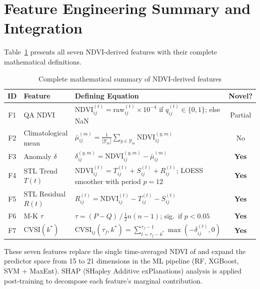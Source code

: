 \documentclass[12pt, a4paper]{article}
\begin{document}
\section{Feature Engineering Summary and Integration}
\label{sec:summary}

Table~\ref{tab:features_math} presents all seven NDVI-derived features
with their complete mathematical definitions.

\begin{table}[H]
\centering
\caption{Complete mathematical summary of NDVI-derived features}
\label{tab:features_math}
\small
\begin{tabularx}{\textwidth}{@{}clXc@{}}
\toprule
\textbf{ID} & \textbf{Feature} & \textbf{Defining Equation} &
\textbf{Novel?} \\
\midrule
F1 & QA NDVI &
  $\mathrm{NDVI}_{ij}^{(t)} = \mathrm{raw}_{ij}^{(t)} \times 10^{-4}$
  if $q_{ij}^{(t)} \in \{0,1\}$; else NaN & Partial \\[4pt]
F2 & Climatological mean &
  $\bar{\mu}_{ij}^{(m)} = \frac{1}{|\mathcal{Y}_m|}
  \sum_{y \in \mathcal{Y}_m} \mathrm{NDVI}_{ij}^{(y,m)}$ & No \\[4pt]
\rowcolor{lightgreen}
F3 & Anomaly $\delta$ &
  $\delta_{ij}^{(y,m)} = \mathrm{NDVI}_{ij}^{(y,m)} -
  \bar{\mu}_{ij}^{(m)}$ & \textbf{Yes} \\[4pt]
\rowcolor{lightgreen}
F4 & STL Trend $T(t)$ &
  $\mathrm{NDVI}_{ij}^{(t)} = T_{ij}^{(t)} + S_{ij}^{(t)} +
  R_{ij}^{(t)}$; LOESS smoother with period $p=12$ & \textbf{Yes} \\[4pt]
\rowcolor{lightgreen}
F5 & STL Residual $R(t)$ &
  $R_{ij}^{(t)} = \mathrm{NDVI}_{ij}^{(t)} - T_{ij}^{(t)} -
  S_{ij}^{(t)}$ & \textbf{Yes} \\[4pt]
\rowcolor{lightgreen}
F6 & M-K $\tau$ &
  $\tau = (P - Q) \,/\, \frac{1}{2}n(n-1)$; sig.\ if $p < 0.05$
  & \textbf{Yes} \\[4pt]
\rowcolor{lightgreen}
F7 & CVSI$(k^{*})$ &
  $\mathrm{CVSI}_{ij}(\tau_f, k^{*}) =
  \sum_{t=\tau_f - k^{*}}^{\tau_f - 1} \max(-\delta_{ij}^{(t)}, 0)$
  & \textbf{Yes} \\
\bottomrule
\end{tabularx}
\end{table}

These seven features replace the single time-averaged NDVI of
\citet{biswas2025} and expand the predictor space from 15 to 21
dimensions in the ML pipeline (RF, XGBoost, SVM + MaxEnt).
SHAP (SHapley Additive exPlanations) analysis \citep{lundberg2017}
is applied post-training to decompose each feature's marginal
contribution.
\end{document}
